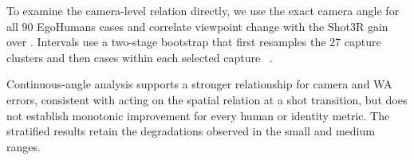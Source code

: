 \begin{table}[t]
  \centering
  \caption{Additional gain at large viewpoints relative to the remaining
  views, with 95\% recording/capture-cluster bootstrap intervals.}
  \label{tab:supp-viewpoint-interaction}
  \supptablesize
  
\end{table}

To examine the camera-level relation directly, we use the exact camera angle
for all 90 EgoHumans cases and correlate viewpoint change with the Shot3R gain
over \humanthree{}. Intervals use a two-stage bootstrap that first resamples
the 27 capture clusters and then cases within each selected capture
~\citep{davison1997bootstrap}.

\begin{table}[t]
  \centering
  \caption{Relation between viewpoint change and reconstruction gain on
  EgoHumans. Left: case-level Spearman correlation with two-stage
  capture-cluster bootstrap intervals. Right: mean gains in the predefined
  angle strata. W/WA are in mm, camera rotation in degrees, and camera
  translation in m; positive values favour \method{}.}
  \label{tab:supp-egohumans-viewpoint-camera}
  \supptablesize
  
\end{table}

Continuous-angle analysis supports a stronger relationship for camera and WA
errors, consistent with \method{} acting on the spatial relation at a shot
transition, but does not establish monotonic improvement for every human or
identity metric. The stratified results retain the degradations observed in
the small and medium ranges.

